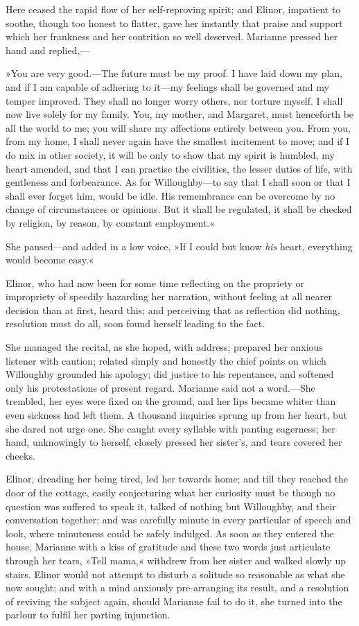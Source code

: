 Here ceased the rapid flow of her self-reproving spirit; and Elinor, impatient to soothe, though too honest to flatter, gave her instantly that praise and support which her frankness and her contrition so well deserved. Marianne pressed her hand and replied,—

»You are very good.—The future must be my proof. I have laid down my plan, and if I am capable of adhering to it—my feelings shall be governed and my temper improved. They shall no longer worry others, nor torture myself. I shall now live solely for my family. You, my mother, and Margaret, must henceforth be all the world to me; you will share my affections entirely between you. From you, from my home, I shall never again have the smallest incitement to move; and if I do mix in other society, it will be only to show that my spirit is humbled, my heart amended, and that I can practise the civilities, the lesser duties of life, with gentleness and forbearance. As for Willoughby—to say that I shall soon or that I shall ever forget him, would be idle. His remembrance can be overcome by no change of circumstances or opinions. But it shall be regulated, it shall be checked by religion, by reason, by constant employment.«

She paused—and added in a low voice, »If I could but know \textit{his} heart, everything would become easy.«

Elinor, who had now been for some time reflecting on the propriety or impropriety of speedily hazarding her narration, without feeling at all nearer decision than at first, heard this; and perceiving that as reflection did nothing, resolution must do all, soon found herself leading to the fact.

She managed the recital, as she hoped, with address; prepared her anxious listener with caution; related simply and honestly the chief points on which Willoughby grounded his apology; did justice to his repentance, and softened only his protestations of present regard. Marianne said not a word.—She trembled, her eyes were fixed on the ground, and her lips became whiter than even sickness had left them. A thousand inquiries sprung up from her heart, but she dared not urge one. She caught every syllable with panting eagerness; her hand, unknowingly to herself, closely pressed her sister’s, and tears covered her cheeks.

Elinor, dreading her being tired, led her towards home; and till they reached the door of the cottage, easily conjecturing what her curiosity must be though no question was suffered to speak it, talked of nothing but Willoughby, and their conversation together; and was carefully minute in every particular of speech and look, where minuteness could be safely indulged. As soon as they entered the house, Marianne with a kiss of gratitude and these two words just articulate through her tears, »Tell mama,« withdrew from her sister and walked slowly up stairs. Elinor would not attempt to disturb a solitude so reasonable as what she now sought; and with a mind anxiously pre-arranging its result, and a resolution of reviving the subject again, should Marianne fail to do it, she turned into the parlour to fulfil her parting injunction.